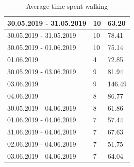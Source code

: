 \begin{table}[]
{\begin{tabular}{|l|l|l|}
			30.05.2019 - 31.05.2019    & 10         & 63.20                    \\ \hline
			30.05.2019 - 31.05.2019    & 10         & 78.41                    \\ \hline
			30.05.2019 - 01.06.2019    & 10         & 75.14                    \\ \hline
			01.06.2019                 & 4          & 72.85                    \\ \hline
			30.05.2019 - 03.06.2019    & 9          & 81.94                    \\ \hline
			03.06.2019                 & 9          & 146.49                   \\ \hline
			04.06.2019                 & 8          & 86.77                    \\ \hline
			30.05.2019 - 04.06.2019    & 8          & 61.86                    \\ \hline
			01.06.2019 - 04.06.2019    & 7          & 57.44                    \\ \hline
			31.06.2019 - 04.06.2019    & 7          & 67.63                    \\ \hline
			02.06.2019 - 04.06.2019    & 7          & 51.75                    \\ \hline
			03.06.2019 - 04.06.2019    & 7          & 64.04                    \\ \hline
		\end{tabular}
		\caption{Average time spent walking}
		\label{results-walking}
	}
\end{table}

